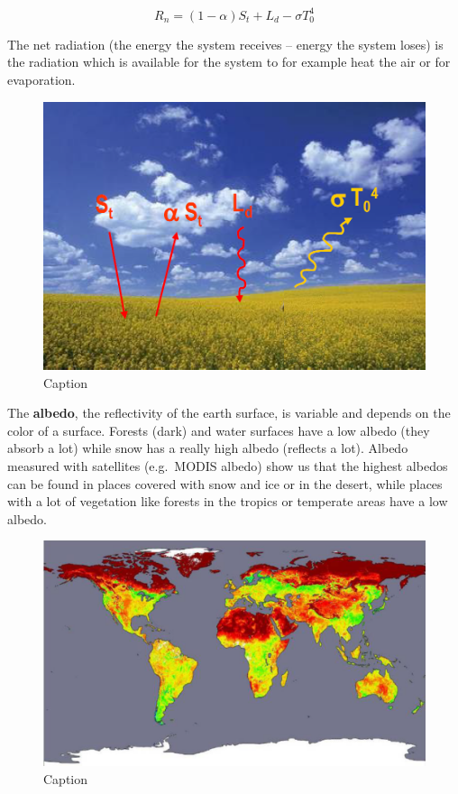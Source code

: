 \documentclass[oneside]{book}
\begin{document}
\begin{equation} 
  R_n = (1 - \alpha)S_t + L_d - \sigma T_0^{4}
  \label{eq:EqNetRadiation}
\end{equation}

The net radiation (the energy the system receives -- energy the system
loses) is the radiation which is available for the system to for example
heat the air or for evaporation.

\begin{figure}

{\centering \includegraphics[width=0.5\linewidth]{figures/Figure134} 

}

\caption{Caption}\label{fig:RadiationAlbedo}
\end{figure}

The \textbf{albedo}, the reflectivity of the earth surface, is variable
and depends on the color of a surface. Forests (dark) and water surfaces
have a low albedo (they absorb a lot) while snow has a really high
albedo (reflects a lot). Albedo measured with satellites (e.g.~MODIS
albedo) show us that the highest albedos can be found in places covered
with snow and ice or in the desert, while places with a lot of
vegetation like forests in the tropics or temperate areas have a low
albedo.

\begin{figure}

{\centering \includegraphics[width=0.5\linewidth]{figures/Figure135} 

}

\caption{Caption}\label{fig:albedo}
\end{figure}
\end{document}
